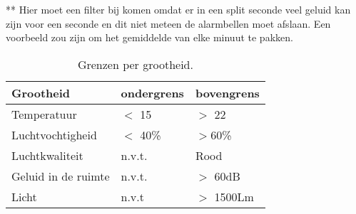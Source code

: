 ** Hier moet een filter bij komen omdat er in een split seconde veel geluid kan zijn voor een seconde en dit niet meteen de alarmbellen moet afslaan. Een voorbeeld zou zijn om het gemiddelde van elke minuut te pakken.

\begin{table}[ht]
    \begin{tabular}{p{3cm}||p{3cm}|p{3cm}}
       Grootheid  & ondergrens & bovengrens \\
       \hline
       Temperatuur  & $<$ 15& $>$ 22 \cite{Temperatuur}\\
       Luchtvochtigheid & $<$ 40\% & $>$60\% \cite{Luchtvochtigheid}\\
       Luchtkwaliteit & n.v.t. & Rood \cite{Gezonde}\\
       Geluid in de ruimte & n.v.t. & $>$ 60dB \cite{Geluidsoverlast}\\
       Licht & n.v.t & $>$ 1500Lm \cite{Lumen}\\
    \end{tabular}
    \caption{Grenzen per grootheid.}
    \label{tab:3}
\end{table}